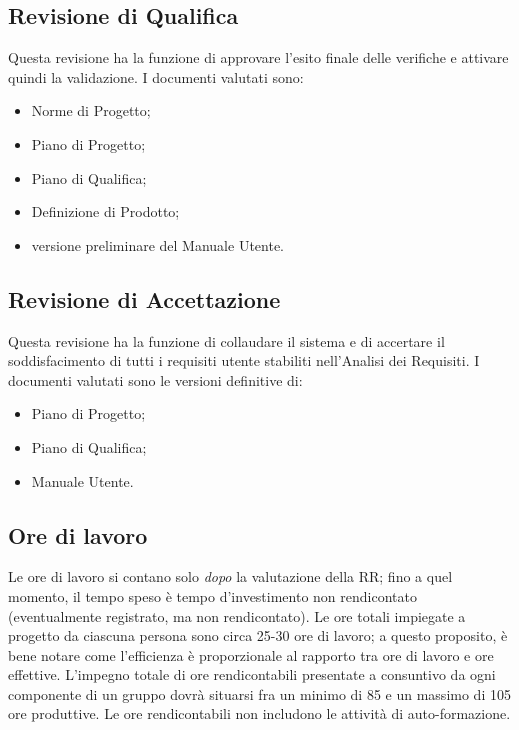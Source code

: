 \documentclass[a4paper]{article}
\begin{document}
		
	\subsection{Revisione di Qualifica}

		
Questa revisione ha la funzione di approvare l'esito finale delle verifiche e attivare quindi la validazione. I documenti valutati sono:
		
	\begin{itemize}
		
			
	\item Norme di Progetto;
			
	\item Piano di Progetto;
			
	\item Piano di Qualifica;
			
	\item Definizione di Prodotto;
			
	\item versione preliminare del Manuale Utente.
		
	\end{itemize}


		
	\subsection{Revisione di Accettazione}

		
Questa revisione ha la funzione di collaudare il sistema e di accertare il soddisfacimento di tutti i requisiti utente stabiliti nell'Analisi dei Requisiti. I documenti valutati sono le versioni definitive di:
		
	\begin{itemize}
		
			
	\item Piano di Progetto;
			
	\item Piano di Qualifica;
			
	\item Manuale Utente.
		
	\end{itemize}


		
	\subsection{Ore di lavoro}

		
Le ore di lavoro si contano solo \emph{dopo} la valutazione della RR; fino a quel momento, il tempo speso è tempo d'investimento non rendicontato (eventualmente registrato, ma non rendicontato). Le ore totali impiegate a progetto da ciascuna persona sono circa 25-30 ore di lavoro; a questo proposito, è bene notare come l'efficienza è proporzionale al rapporto tra ore di lavoro e ore effettive. L'impegno totale di ore rendicontabili presentate a consuntivo da ogni componente di un gruppo dovrà situarsi fra un minimo di 85 e un massimo di 105 ore produttive. Le ore rendicontabili non includono le attività di auto-formazione.
	
\end{document}
